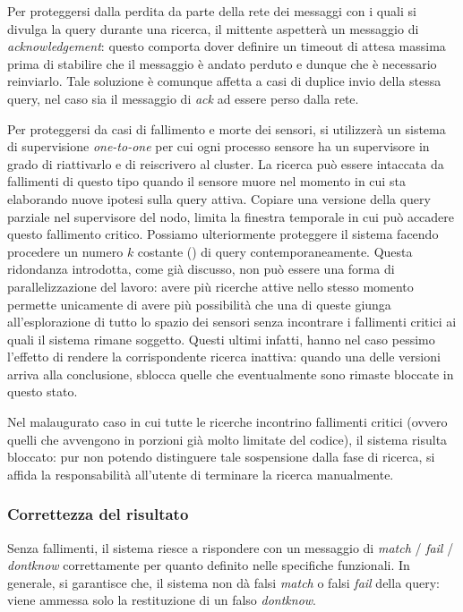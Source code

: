 \documentclass{llncs}
\begin{document}
Per proteggersi dalla perdita da parte della rete dei messaggi
con i quali si divulga la query durante una ricerca,
il mittente aspetterà un messaggio di \emph{acknowledgement}: questo
comporta dover definire un timeout di attesa massima prima di
stabilire che il messaggio è andato perduto e dunque che è necessario
reinviarlo. Tale soluzione è comunque affetta a casi di duplice invio
della stessa query, nel caso sia il messaggio di \emph{ack} ad
essere perso dalla rete.

Per proteggersi da casi di fallimento e morte dei sensori,
si utilizzerà un sistema di supervisione \emph{one-to-one}
per cui ogni processo sensore ha un supervisore in grado di
riattivarlo e di reiscrivero al cluster.
La ricerca può essere intaccata da fallimenti di questo tipo
quando il sensore muore nel momento in cui sta elaborando
nuove ipotesi sulla query attiva.
Copiare una versione della query parziale nel supervisore del nodo,
limita la finestra temporale in cui può accadere questo fallimento
critico.
Possiamo ulteriormente proteggere il sistema facendo procedere
un numero $k$ costante () di query
contemporaneamente. Questa ridondanza introdotta, come già discusso,
non può essere una forma di parallelizzazione del lavoro: avere
più ricerche attive nello stesso momento permette unicamente di
avere più possibilità che una di queste giunga all'esplorazione
di tutto lo spazio dei sensori senza incontrare i fallimenti critici
ai quali il sistema rimane soggetto.
Questi ultimi infatti, hanno nel caso pessimo l'effetto di
rendere la corrispondente ricerca inattiva: quando una delle versioni
arriva alla conclusione, sblocca quelle che eventualmente sono rimaste
bloccate in questo stato.

Nel malaugurato caso in cui tutte le ricerche incontrino fallimenti
critici (ovvero quelli che avvengono in porzioni già molto limitate
del codice), il sistema risulta bloccato: pur non potendo
distinguere tale sospensione dalla fase di ricerca, si affida
la responsabilità all'utente di terminare la ricerca manualmente.

\subsubsection*{Correttezza del risultato}
Senza fallimenti, il sistema riesce a rispondere con un messaggio di
\emph{match} / \emph{fail} / \emph{dontknow} correttamente
per quanto definito nelle specifiche funzionali.
In generale, si garantisce che,
il sistema non dà falsi \emph{match} o falsi \emph{fail} della query:
viene ammessa solo la restituzione di un falso \emph{dontknow}.
\end{document}
